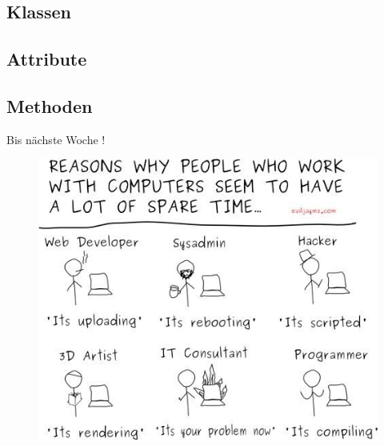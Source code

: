 \documentclass[18pt]{beamer}
\begin{document}
\subsection{Klassen}

\subsection{Attribute}

\subsection{Methoden}

\appendix
\beginbackup

\begin{frame}{Bis nächste Woche !}
    \begin{figure}
        \includegraphics[scale=0.4]{img/sparetime.jpg}
    \end{figure}
\end{frame}

\backupend
\end{document}
